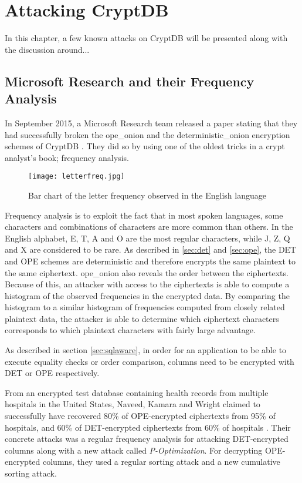 \chapter{Attacking CryptDB}
\label{chp:attacks}

In this chapter, a few known attacks on CryptDB will be presented along with the discussion around...

\section{Microsoft Research and their Frequency Analysis}

In September 2015, a Microsoft Research team released a paper stating that they had successfully broken the \gls{ope_onion} and the \gls{deterministic_onion} encryption schemes of CryptDB \cite{microsoft_cryptdb}. They did so by using one of the oldest tricks in a crypt analyst's book; frequency analysis.

\begin{wrapfigure}[13]{r}[1pt]{5.2cm}
\centering
\texttt{[image: letterfreq.jpg]}
\caption{Bar chart of the letter frequency observed in the English language}
\label{fig:letter_freq}
\end{wrapfigure}
Frequency analysis is to exploit the fact that in most spoken languages, some characters and combinations of characters are more common than others. In the English alphabet, E, T, A and O are the most regular characters, while J, Z, Q and X are considered to be rare. As described in \ref{sec:det} and \ref{sec:ope}, the DET and OPE schemes are deterministic and therefore encrypts the same plaintext to the same ciphertext. \gls{ope_onion} also reveals the order between the ciphertexts. Because of this, an attacker with access to the ciphertexts is able to compute a histogram of the observed frequencies in the encrypted data. By comparing the histogram to a similar histogram of frequencies computed from closely related plaintext data, the attacker is able to determine which ciphertext characters corresponds to which plaintext characters with fairly large advantage.


As described in section \ref{sec:sqlaware}, in order for an application to be able to execute equality checks or order comparison, columns need to be encrypted with DET or OPE respectively. 




From an encrypted test database containing health records from multiple hospitals in the United States, Naveed, Kamara and Wright claimed to successfully have recovered 80\% of OPE-encrypted ciphertexts from 95\% of hospitals, and 60\% of DET-encrypted ciphertexts from 60\% of hospitals \cite{microsoft_cryptdb}. Their concrete attacks was a regular frequency analysis for attacking DET-encrypted columns along with a new attack called \emph{P-Optimization}. For decrypting OPE-encrypted columns, they used a regular sorting attack and a new cumulative sorting attack.

